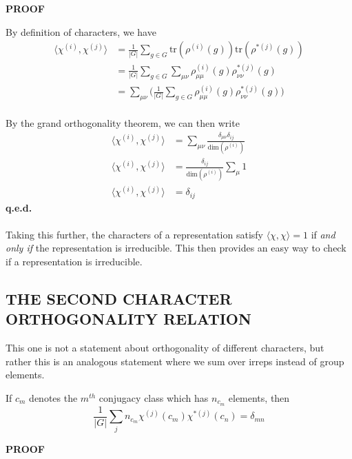 \documentclass[9 pt]{report}
\begin{document}
\begin{center}
\textbf{PROOF}
\end{center}
By definition of characters, we have
\begin{align}
\langle \chi^{(i)}, \chi^{(j)} \rangle &= \frac{1}{|G|}\sum_{g\in G}\text{tr}(\rho^{(i)}(g))\text{tr}(\rho^{*(j)}(g)) 
\nonumber\\
&= \frac{1}{|G|}\sum_{g\in G}\sum_{\mu\nu}\rho^{(i)}_{\mu\mu}(g)\rho^{*(j)}_{\nu\nu}(g)
\nonumber\\
&= \sum_{\mu\nu}\bigg(\frac{1}{|G|}\sum_{g\in G}\rho^{(i)}_{\mu\mu}(g)\rho^{*(j)}_{\nu\nu}(g)\bigg)
\nonumber
\end{align}
\\
By the grand orthogonality theorem, we can then write
\begin{align}
\langle \chi^{(i)}, \chi^{(j)} \rangle  &= \sum_{\mu\nu} \frac{\delta_{\mu\nu}\delta_{ij}}{\text{dim}(\rho^{(i)})} 
\nonumber \\
\langle \chi^{(i)}, \chi^{(j)} \rangle  &= \frac{\delta_{ij}}{\text{dim}(\rho^{(i)})}\sum_{\mu}1 
\nonumber \\
\langle \chi^{(i)}, \chi^{(j)} \rangle  &= \delta_{ij}
\nonumber
\end{align}
\textbf{q.e.d.}
\\
\\
Taking this further, the characters of a representation satisfy $\langle\chi,\chi\rangle=1$ if \emph{and only if} the representation is irreducible. This then provides an easy way to check if a representation is irreducible.

\break

{\centering
\subsection*{THE SECOND CHARACTER ORTHOGONALITY RELATION}}
This one is not a statement about orthogonality of different characters, but rather this is an analogous statement where we sum over irreps instead of group elements. 

\begin{tcolorbox}
	If $c_{m}$ denotes the $m^{th}$ conjugacy class which has $n_{c_m}$ elements, then
	$$ \frac{1}{|G|}\sum_{j}n_{c_m}\chi^{(j)}(c_m)\chi^{*(j)}(c_n) = \delta_{mn} $$
\end{tcolorbox}

\begin{center}
	\textbf{PROOF}
\end{center}
\end{document}
